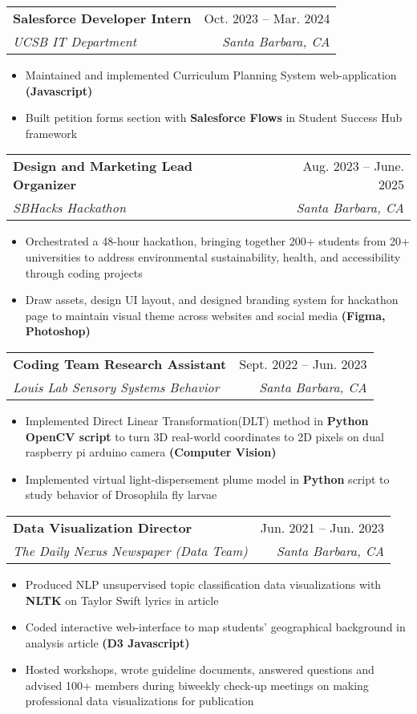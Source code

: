 \documentclass[letterpaper,11pt]{article}
\makeatletter
\newcommand{\resumeItem}[1]{
  \item\small{
    {#1 \vspace{-3pt}}
  }
}
\newcommand{\resumeSubheading}[4]{
  \vspace{-2pt}\item
    \begin{tabular*}{0.97\textwidth}[t]{l@{\extracolsep{\fill}}r}
      \textbf{#1} & #2 \\
      \textit{\small#3} & \textit{\small #4} \\
    \end{tabular*}\vspace{-7pt}
}
\newcommand{\resumeSubSubheading}[2]{
    \item
    \begin{tabular*}{0.97\textwidth}{l@{\extracolsep{\fill}}r}
      \textit{\small#1} & \textit{\small #2} \\
    \end{tabular*}\vspace{-7pt}
}
\newcommand{\resumeSubHeadingListEnd}{\end{itemize}}
\newcommand{\resumeItemListStart}{\begin{itemize}}
\newcommand{\resumeItemListEnd}{\end{itemize}\vspace{-5pt}}
\makeatother
\begin{document}

\resumeSubheading
{Salesforce Developer Intern}{Oct. 2023 -- Mar. 2024}
{UCSB IT Department}{Santa Barbara, CA}
\resumeItemListStart
\resumeItem{Maintained and implemented Curriculum Planning System web-application \textbf{(Javascript)}}
\resumeItem{Built petition forms section with \textbf{Salesforce Flows} in Student Success Hub framework}
\resumeItemListEnd

\resumeSubheading
{Design and Marketing Lead Organizer}{Aug. 2023 -- June. 2025}
{SBHacks Hackathon}{Santa Barbara, CA}
\resumeItemListStart
\resumeItem{Orchestrated a 48-hour hackathon, bringing together 200+ students from 20+ universities to address environmental
sustainability, health, and accessibility through coding projects}
\resumeItem{Draw assets, design UI layout, and designed branding system for hackathon page to maintain visual theme across websites
and social media \textbf{(Figma, Photoshop)}}
\resumeItemListEnd

\resumeSubheading
{Coding Team Research Assistant}{Sept. 2022 -- Jun. 2023}
{Louis Lab Sensory Systems Behavior}{Santa Barbara, CA}
\resumeItemListStart
\resumeItem{Implemented Direct Linear Transformation(DLT) method in \textbf{Python OpenCV script} to turn 3D real-world coordinates to
2D pixels on dual raspberry pi arduino camera \textbf{(Computer Vision)}}
\resumeItem{Implemented virtual light-dispersement plume model in \textbf{Python} script to study behavior of Drosophila fly larvae}
\resumeItemListEnd

\resumeSubheading
{Data Visualization Director}{Jun. 2021 -- Jun. 2023}
{The Daily Nexus Newspaper (Data Team)}{Santa Barbara, CA}
\resumeItemListStart
\resumeItem{Produced NLP unsupervised topic classification data visualizations with \textbf{NLTK} on Taylor Swift lyrics in article}
\resumeItem{Coded interactive web-interface to map students' geographical background in analysis article \textbf{(D3 Javascript)}}
\resumeItem{Hosted workshops, wrote guideline documents, answered questions and advised 100+ members during biweekly check-up
meetings on making professional data visualizations for publication}
\resumeItemListEnd
\end{document}

